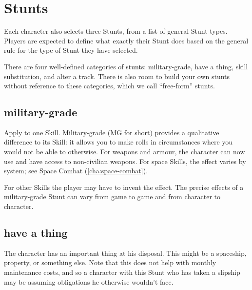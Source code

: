 \section{Stunts}\label{sec:Stunts} %

Each character also selects three Stunts, from a list of general Stunt types. Players are expected to define what exactly their Stunt does based on the general rule for the type of Stunt they have selected.


There are four well-defined categories of stunts: military-grade, have a thing, skill substitution, and alter a track. There is also room to build your own stunts without reference to these categories, which we call ``free-form'' stunts.

\subsection{military-grade}

Apply to one Skill. Military-grade (MG for short) provides a qualitative difference to its Skill: it allows you to make rolls in circumstances where you would not be able to otherwise. For weapons and armour, the character can now use and have access to non-civilian weapons. For space Skills, the effect varies by system; see Space Combat (\autoref{cha:space-combat}).

For other Skills the player may have to invent the effect. The precise effects of a military-grade Stunt can vary from game to game and from character to character.

\subsection{have a thing}

The character has an important thing at his disposal. This might be a spaceship, property, or something else. Note that this does not help with monthly maintenance costs, and so a character with this Stunt who has taken a slipship may be assuming obligations he otherwise wouldn't face.

